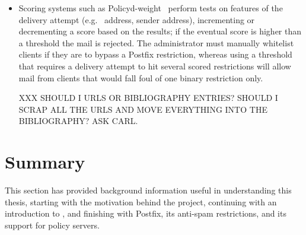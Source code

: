 \begin{itemize}
        \begin{table}[ht]
            \caption{Summary of rejections}\label{Summary of rejections}
            
        \end{table}

    \item Scoring systems such as Policyd-weight~\cite{policyd-weight}
        perform tests on features of the delivery attempt (e.g.\
         address, sender address), incrementing or decrementing
        a score based on the results; if the eventual score is higher than
        a threshold the mail is rejected.  The administrator must manually
        whitelist clients if they are to bypass a Postfix restriction,
        whereas using a threshold that requires a delivery attempt to hit
        several scored restrictions will allow mail from clients that would
        fall foul of one binary restriction only.

        XXX SHOULD I URLS OR BIBLIOGRAPHY ENTRIES\@?  SHOULD I SCRAP ALL
        THE URLS AND MOVE EVERYTHING INTO THE BIBLIOGRAPHY\@?  ASK CARL\@.

\end{itemize}

\section{Summary}

This section has provided background information useful in understanding
this thesis, starting with the motivation behind the project, continuing
with an introduction to \acronym{SMTP}, and finishing with Postfix, its
anti-spam restrictions, and its support for policy servers.

